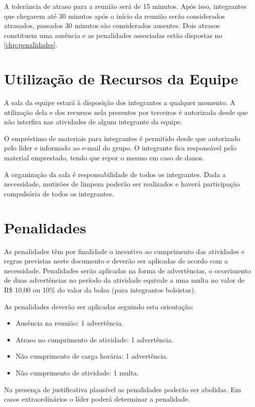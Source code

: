 A tolerância de atraso para a reunião será de 15 minutos. Após isso, integrantes que chegarem até 30 minutos após o início da reunião serão considerados atrasados, passados 30 minutos são considerados ausentes. Dois atrasos constituem uma ausência e as penalidades associadas estão dispostas no \autoref{chp:penalidades}.


\chapter{Utilização de Recursos da Equipe}
\label{chp:recursos}

A sala da equipe estará à disposição dos integrantes a qualquer momento. A utilização dela e dos recursos nela presentes por terceiros é autorizada desde que não interfira nas atividades de algum integrante da equipe.

O empréstimo de materiais para integrantes é permitido desde que autorizado pelo líder e informado ao e-mail do grupo. O integrante fica responsável pelo material emprestado, tendo que repor o mesmo em caso de danos.

A organização da sala é responsabilidade de todos os integrantes. Dada a necessidade, mutirões de limpeza poderão ser realizados e haverá participação compulsória de todos os integrantes.

\chapter{Penalidades}
\label{chp:penalidades}
As penalidades têm por finalidade o incentivo ao cumprimento das atividades e regras previstas neste documento e deverão ser aplicadas de acordo com a necessidade. Penalidades serão aplicadas na forma de advertências, o ocorrimento de duas advertências  no período da atividade equivale a uma multa no valor de R\$ 10,00 ou 10\% do valor da bolsa (para integrantes bolsistas).

As penalidades deverão ser aplicadas seguindo esta orientação:
\begin{itemize}
\item[] Ausência na reunião: 1 advertência.
\item[] Atraso no cumprimento de atividade: 1 advertência.
\item[] Não cumprimento de carga horária: 1 advertência.
\item[] Não cumprimento de atividade: 1 multa.
\end{itemize}
Na presença de justificativa plausível as penalidades poderão ser abolidas. Em casos extraordinários o líder poderá determinar a penalidade.

